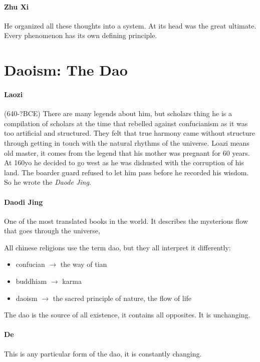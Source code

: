 \documentclass{article}
\begin{document}
\paragraph{Zhu Xi}
\label{par:zhu_xi}
He organized all these thoughts into a system. At its head was the great ultimate. Every phenomenon has its own defining principle.

\section*{Daoism: The Dao}
\label{sec:daoism_the_dao}
\paragraph{Laozi}
\label{par:laozi}
(640-?BCE) There are many legends about him, but scholars thing he is a compilation of scholars at the time that rebelled against confucianism as it was too artificial and structured. They felt that true harmony came without structure through getting in touch with the natural rhythms of the universe. Loazi means old master, it comes from the legend that his mother was pregnant for 60 years. At 160yo he decided to go west as he was dishusted with the corruption of his land. The boarder guard refused to let him pass before he recorded his wisdom. So he wrote the \emph{Daode Jing}.

\paragraph{Daodi Jing}
\label{par:daodi_jing}
One of the most translated books in the world. It describes the mysterious flow that goes through the universe,

All chinese religions use the term dao, but they all interpret it differently:
\begin{itemize}
	\item confucian $\rightarrow$ the way of tian
	\item buddhiam $\rightarrow$ karma
	\item daoism $\rightarrow$ the sacred principle of nature, the flow of life
\end{itemize}

The dao is the source of all existence, it contains all opposites. It is unchanging.

\paragraph{De}
\label{par:de}
This is any particular form of the dao, it is constantly changing.
\end{document}
